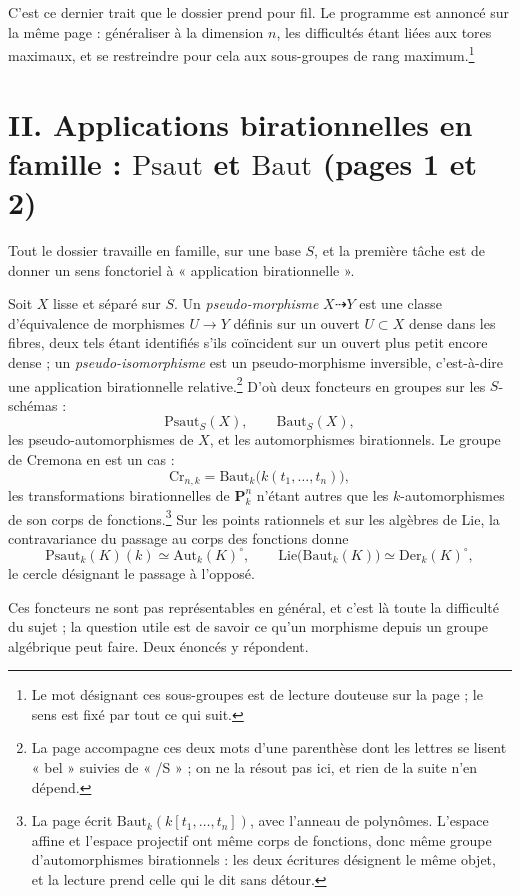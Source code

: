 \documentclass[11pt,a4paper]{article}
\begin{document}
C'est ce dernier trait que le dossier prend pour fil. Le programme est annoncé
sur la même page : généraliser à la dimension $n$, les difficultés étant liées
aux tores maximaux, et se restreindre pour cela aux sous-groupes de rang
maximum.\footnote{Le mot désignant ces sous-groupes est de lecture douteuse sur
la page ; le sens est fixé par tout ce qui suit.}

\section*{II. Applications birationnelles en famille : $\mathrm{Psaut}$ et $\mathrm{Baut}$ (pages 1 et 2)}

Tout le dossier travaille en famille, sur une base $S$, et la première tâche
est de donner un sens fonctoriel à « application birationnelle ».

Soit $X$ lisse et séparé sur $S$. Un \emph{pseudo-morphisme} $X \dashrightarrow
Y$ est une classe d'équivalence de morphismes $U \to Y$ définis sur un ouvert
$U \subset X$ dense dans les fibres, deux tels étant identifiés s'ils
coïncident sur un ouvert plus petit encore dense ; un
\emph{pseudo-isomorphisme} est un pseudo-morphisme inversible, c'est-à-dire une
application birationnelle relative.\footnote{La page accompagne ces deux mots
d'une parenthèse dont les lettres se lisent « bel » suivies de « /S » ; on ne
la résout pas ici, et rien de la suite n'en dépend.} D'où deux foncteurs en
groupes sur les $S$-schémas :
\[
  \mathrm{Psaut}_S(X), \qquad \mathrm{Baut}_S(X),
\]
les pseudo-automorphismes de $X$, et les automorphismes birationnels. Le groupe
de Cremona en est un cas :
\[
  \mathrm{Cr}_{n,k} = \mathrm{Baut}_k\bigl(k(t_1, \ldots, t_n)\bigr),
\]
les transformations birationnelles de $\mathbf{P}^n_k$ n'étant autres que les
$k$-automorphismes de son corps de fonctions.\footnote{La page écrit
$\mathrm{Baut}_k(k[t_1,\ldots,t_n])$, avec l'anneau de polynômes.
L'espace affine et l'espace projectif ont même corps de fonctions, donc même
groupe d'automorphismes birationnels : les deux écritures désignent le même
objet, et la lecture prend celle qui le dit sans détour.} Sur les points
rationnels et sur les algèbres de Lie, la contravariance du passage au corps
des fonctions donne
\[
  \mathrm{Psaut}_k(K)(k) \simeq \mathrm{Aut}_k(K)^\circ, \qquad
  \mathrm{Lie}\bigl(\mathrm{Baut}_k(K)\bigr) \simeq \mathrm{Der}_k(K)^\circ,
\]
le cercle désignant le passage à l'opposé.

Ces foncteurs ne sont pas représentables en général, et c'est là toute la
difficulté du sujet ; la question utile est de savoir ce qu'un morphisme
depuis un groupe algébrique peut faire. Deux énoncés y répondent.
\end{document}
